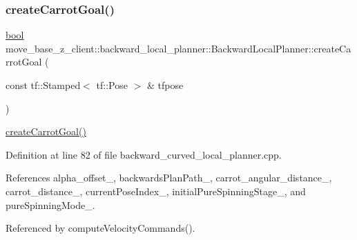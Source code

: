\subsubsection{\texorpdfstring{create\+Carrot\+Goal()}{createCarrotGoal()}}
{\footnotesize\ttfamily \hyperlink{classbool}{bool} move\+\_\+base\+\_\+z\+\_\+client\+::backward\+\_\+local\+\_\+planner\+::\+Backward\+Local\+Planner\+::create\+Carrot\+Goal (\begin{DoxyParamCaption}\item[{const tf\+::\+Stamped$<$ tf\+::\+Pose $>$ \&}]{tfpose }\end{DoxyParamCaption})\hspace{0.3cm}{\ttfamily [private]}}

\hyperlink{classmove__base__z__client_1_1backward__local__planner_1_1BackwardLocalPlanner_a0a48c91cb8043aa15d01eec4931e8552}{create\+Carrot\+Goal()} 

Definition at line 82 of file backward\+\_\+curved\+\_\+local\+\_\+planner.\+cpp.



References alpha\+\_\+offset\+\_\+, backwards\+Plan\+Path\+\_\+, carrot\+\_\+angular\+\_\+distance\+\_\+, carrot\+\_\+distance\+\_\+, current\+Pose\+Index\+\_\+, initial\+Pure\+Spinning\+Stage\+\_\+, and pure\+Spinning\+Mode\+\_\+.



Referenced by compute\+Velocity\+Commands().


